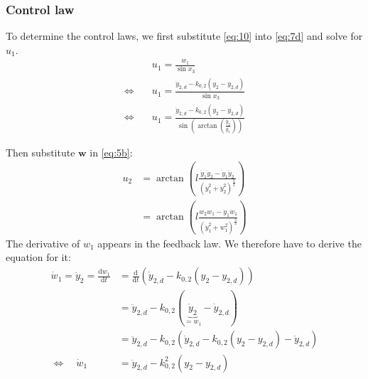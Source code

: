 \documentclass[a4paper,11pt,headings=standardclasses]{scrartcl}%
\renewcommand{\d}{\mathrm{d}} %
\begin{document}
\subsubsection{Control law}
To determine the control laws, we first substitute \eqref{eq:10} into \eqref{eq:7d} and solve for $u_1$. 
\begin{subequations}
\begin{align}
&u_1 = \frac{w_1}{\sin{x_3}} \\
\Leftrightarrow \quad & u_1 = \frac{\dot{y}_{2,d} - k_{0,2}(y_2-y_{2,d})}{\sin{x_3}} \\
\Leftrightarrow \quad & u_1 = \frac{\dot{y}_{2,d} - k_{0,2}(y_2-y_{2,d})}{\sin{\left(\arctan\left(\frac{\dot{y}_2}{\dot{y}_1}\right)\right)}}
\end{align}
\end{subequations}


Then substitute $\mathbf{w}$ in \eqref{eq:5b}:
\begin{subequations}
\begin{align}
u_2 &= \arctan\left(l \frac{\ddot{y}_1 \dot{y}_2 - \dot{y}_1 \ddot{y}_2}{(\dot{y}_1^2+\dot{y}_2^2)^{\frac{3}{2}}} 
\right) \\
&= \arctan\left(l \frac{w_2 w_1 - \dot{y}_1 \dot{w}_1}{(\dot{y}_1^2+w_1^2)^{\frac{3}{2}}} 
\right) 
\end{align}
\end{subequations}
The derivative of $w_1$ appears in the feedback law. We therefore have to derive the equation for it:
\begin{subequations}
\begin{align}
\dot{w}_1 = \ddot{y}_2 = \frac{\d w_1}{\d t} &= \frac{\d}{\d t}(\dot{y}_{2,d} - k_{0,2}(y_2-y_{2,d})) \\
&=\ddot{y}_{2,d} - k_{0,2}(\underbrace{\dot{y}_2}_{=w_1}-\dot{y}_{2,d}) \\
&=\ddot{y}_{2,d} - k_{0,2}(\dot{y}_{2,d} - k_{0,2}(y_2-y_{2,d})-\dot{y}_{2,d}) \\
\Leftrightarrow \quad \dot{w}_1&=\ddot{y}_{2,d} - k_{0,2}^2(y_2-y_{2,d})
\end{align}
\end{subequations}
\end{document}

